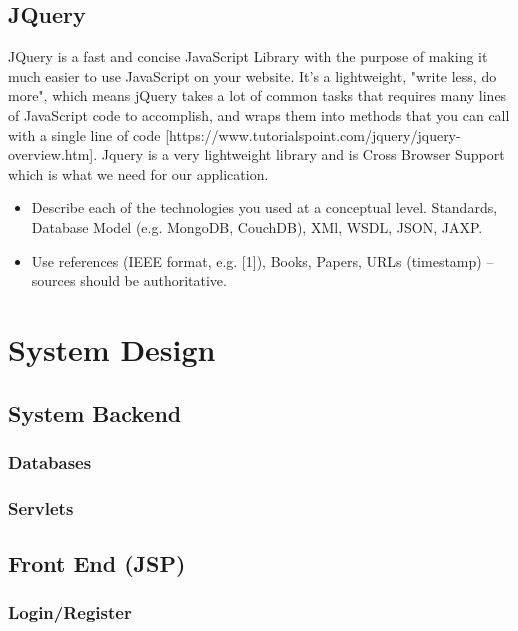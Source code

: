 \section{JQuery}
JQuery is a fast and concise JavaScript Library with the purpose of making it much easier to use JavaScript on your website. It's a lightweight, "write less, do more", which means jQuery takes a lot of common tasks that requires many lines of JavaScript code to accomplish, and wraps them into methods that you can call with a single line of code [https://www.tutorialspoint.com/jquery/jquery-overview.htm]. Jquery is a very lightweight library and is Cross Browser Support which is what we need for our application.

\begin{itemize}
\item Describe each of the technologies you used at a conceptual level. Standards, Database Model (e.g. MongoDB, CouchDB), XMl, WSDL, JSON, JAXP.
\item Use references (IEEE format, e.g. [1]), Books, Papers, URLs (timestamp) – sources should be authoritative. 
\end{itemize}



\chapter{System Design}

\section{System Backend}

\subsection{Databases}

\subsection{Servlets}

\section{Front End (JSP)}

\subsection{Login/Register}

